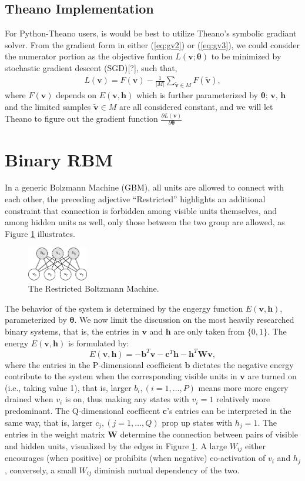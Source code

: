 \documentclass[11pt]{article}
\newcommand{\vb}{\boldsymbol{b}}
\newcommand{\vc}{\boldsymbol{c}}
\newcommand{\vh}{\boldsymbol{h}}
\newcommand{\vv}{\boldsymbol{v}}
\newcommand{\mw}{\boldsymbol{W}}
\newcommand{\vvt}{\tilde{\vv}}
\newcommand{\pEC}{\boldsymbol{\theta}}
\newcommand{\PDV}[2]{\frac{\partial #1}{\partial #2}}
\begin{document}
{\subsection{Theano Implementation}
For Python-Theano users, is would be best to utilize Theano's symbolic gradiant solver. From the gradient form in either (\ref{eq:gv2}) or (\ref{eq:gv3}), we could consider the numerator portion as the objective funtion $L(\vv; \pEC)$ to be minimized by stochastic gradient descent (SGD)[?], such that,
\begin{align}
  L(\vv) = F(\vv) - \frac{1}{|M|}\sum_{\vvt \in M}{F(\vvt)},
\end{align}
where $F(\vv)$ depends on $E(\vv, \vh)$ which is further parameterized by $\pEC$; $\vv$, $\vh$ and the limited samples $\vvt \in M$ are all considered constant, and we will let Theano to figure out the gradient function $\PDV{L(\vv)}{\pEC}$

\section{Binary RBM}
In a generic Bolzmann Machine (GBM), all units are allowed to connect with each other, the preceding adjective ``Restricted'' highlights an additional constraint that connection is forbidden among visible units themselves, and among hidden units as well, only those between the two group are allowed, as Figure \ref{fig:rbm} illustrates.
\begin{figure}[h]
  \centering
  \includegraphics[width=100px]{img/rbm.png}
  \caption{The Restricted Boltzmann Machine.}\label{fig:rbm}
\end{figure}
The behavior of the system is determined by the engergy function $E(\vv, \vh)$, parameterized by $\pEC$. We now limit the discussion on the most heavily researched binary systems, that is, the entries in $\vv$ and $\vh$ are only taken from $\{0, 1\}$. The energy $E(\vv, \vh)$ is formulated by:
\begin{equation} \label{eq:se_bin}
  E(\vv, \vh) = -\vb^T \vv - \vc^T \vh - \vh^T \mw \vv,
\end{equation}
where the entries in the P-dimensional coefficient $\vb$ dictates the negative energy contribute to the system when the corresponding visible units in $\vv$ are turned on (i.e., taking value 1), that is, larger $b_i, (i=1, \dots, P)$ means more more engery drained when $v_i$ is on, thus making any states with $v_i=1$ relatively more predominant. The Q-dimensional coefficent $\vc$'s entries can be interpreted in the same way, that is, larger $c_j, (j=1, \dots, Q)$ prop up states with $h_j=1$. The entries in the weight matrix $\mw$ determine the connection between pairs of visible and hidden units, visualized by the edges in Figure \ref{fig:rbm}. A large $W_{ij}$ either encourages (when positive) or prohibits (when negative) co-activation of $v_i$ and $h_j$, conversely, a small $W_{ij}$ diminish mutual dependency of the two.
}
\end{document}
